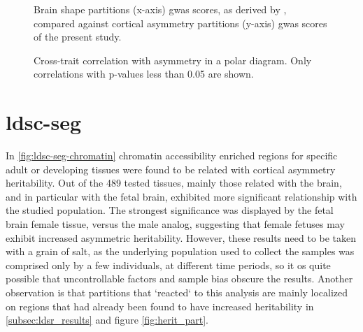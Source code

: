 \begin{figure}[H]
\begin{adjustwidth}{-3cm}{-3cm}
	\par\medskip
	\caption{Brain shape partitions (x-axis) \ac{gwas} scores, as derived by \citet{Naqvi2021}, compared against cortical asymmetry partitions (y-axis) \ac{gwas} scores of the present study.}
	\label{fig:spearmanShape}
\end{adjustwidth}
\end{figure}


\begin{figure}[H]
	\begin{adjustwidth}{-4cm}{-3cm}
		\centering
		\subfloat{
			
		}
		\subfloat{
			
		}
	\end{adjustwidth}	
	\caption[Cross-trait correlation with cortical asymmetry in a polar diagram]{Cross-trait correlation with asymmetry in a polar diagram. Only correlations with p-values less than 0.05 are shown.}
	\label{fig:cross_trait_polar}
\end{figure}


\section{\Ac{ldsc-seg}}
In \autoref{fig:ldsc-seg-chromatin} chromatin accessibility enriched regions for specific adult or developing tissues were found to be related with cortical asymmetry heritability. Out of the 489 tested tissues, mainly those related with the brain, and in particular with the fetal brain, exhibited more significant relationship with the studied population. The strongest significance was displayed by the fetal brain female tissue, versus the male analog, suggesting that female fetuses may exhibit increased asymmetric heritability. However, these results need to be taken with a grain of salt, as the underlying population used to collect the samples was comprised only by a few individuals, at different time periods, so it os quite possible that uncontrollable factors and sample bias obscure the results. Another observation is that partitions that `reacted` to this analysis are mainly localized on regions that had already been found to have increased heritability in \autoref{subsec:ldsr_results} and figure \autoref{fig:herit_part}.


